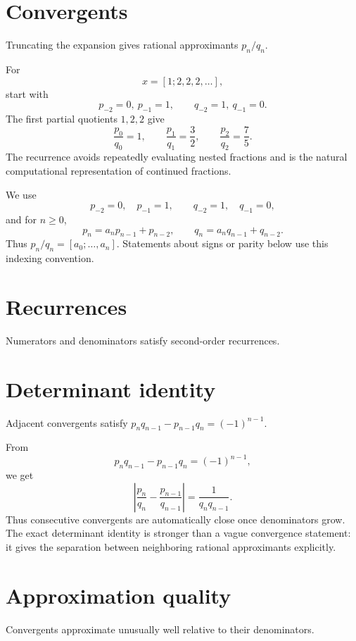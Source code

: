 \section{Convergents}
Truncating the expansion gives rational approximants $p_n/q_n$.


\begin{example}\label{ex:ii25-expand-01}
For
\[
x=[1;2,2,2,\ldots],
\]
start with
\[
p_{-2}=0,\ p_{-1}=1,\qquad q_{-2}=1,\ q_{-1}=0.
\]
The first partial quotients \(1,2,2\) give
\[
\frac{p_0}{q_0}=1,\qquad
\frac{p_1}{q_1}=\frac32,\qquad
\frac{p_2}{q_2}=\frac75.
\]
The recurrence avoids repeatedly evaluating nested fractions and is the natural
computational representation of continued fractions.
\end{example}
\begin{remark}
We use
\[
p_{-2}=0,\quad p_{-1}=1,\qquad q_{-2}=1,\quad q_{-1}=0,
\]
and for $n\ge0$,
\[
p_n=a_np_{n-1}+p_{n-2},\qquad q_n=a_nq_{n-1}+q_{n-2}.
\]
Thus $p_n/q_n=[a_0;\ldots,a_n]$. Statements about signs or parity below use this indexing convention.
\end{remark}

\section{Recurrences}
Numerators and denominators satisfy second-order recurrences.

\section{Determinant identity}
Adjacent convergents satisfy $p_nq_{n-1}-p_{n-1}q_n=(-1)^{n-1}$.


\begin{example}\label{ex:ii25-expand-02}
From
\[
p_nq_{n-1}-p_{n-1}q_n=(-1)^{n-1},
\]
we get
\[
\left|\frac{p_n}{q_n}-\frac{p_{n-1}}{q_{n-1}}\right|
=\frac{1}{q_nq_{n-1}}.
\]
Thus consecutive convergents are automatically close once denominators grow.
The exact determinant identity is stronger than a vague convergence statement:
it gives the separation between neighboring rational approximants explicitly.
\end{example}
\section{Approximation quality}
Convergents approximate unusually well relative to their denominators.


